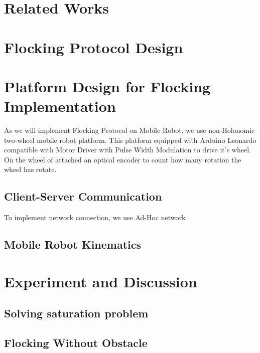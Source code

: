 \documentclass[journal]{IEEEtran}
\begin{document}
					      \section{Related Works}

					      \section{Flocking Protocol Design}

					      \section{Platform Design for Flocking Implementation}
					      As we will implement Flocking Protocol on Mobile Robot, we use non-Holonomic two-wheel mobile robot platform. This platform equipped with Arduino Leonardo compatible with Motor Driver with Pulse Width Modulation to drive it's wheel. On the wheel of attached an optical encoder to count how many rotation the wheel has rotate. 

					      \subsection{Client-Server Communication}
					      To implement network connection, we use Ad-Hoc network
					      \subsection{Mobile Robot Kinematics}

					      \section{Experiment and Discussion}
					      \subsection{Solving saturation problem}

					      \subsection{Flocking Without Obstacle}
\end{document}
